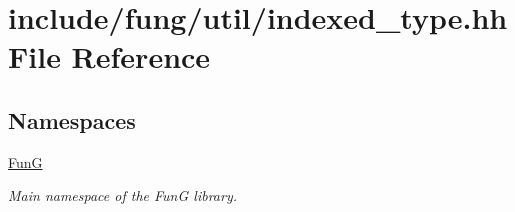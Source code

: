 \hypertarget{indexed__type_8hh}{\section{include/fung/util/indexed\-\_\-type.hh File Reference}
\label{indexed__type_8hh}
}
\subsection*{Namespaces}
\begin{DoxyCompactItemize}
\item 
\hyperlink{namespaceFunG}{Fun\-G}
\begin{DoxyCompactList}\small\item\em Main namespace of the Fun\-G library. \end{DoxyCompactList}\end{DoxyCompactItemize}
